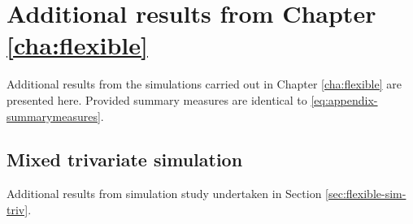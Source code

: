\section{Additional results from Chapter \ref{cha:flexible}}\label{sec:appendix-GMVJM-results}
Additional results from the simulations carried out in Chapter \ref{cha:flexible} are presented here. Provided summary measures are identical to \eqref{eq:appendix-summarymeasures}.

\rmtoc
\subsection{Mixed trivariate simulation}\label{sec:appendix-GMVJM-triv}
Additional results from simulation study undertaken in Section \ref{sec:flexible-sim-triv}.
